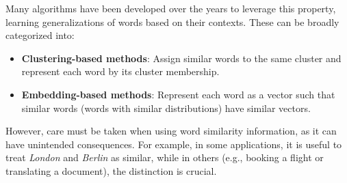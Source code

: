 Many algorithms have been developed over the years to leverage this property, learning generalizations of words based on their contexts. These can be broadly categorized into:
\begin{itemize}
    \item \textbf{Clustering-based methods}: Assign similar words to the same cluster and represent each word by its cluster membership.
    \item \textbf{Embedding-based methods}: Represent each word as a vector such that similar words (words with similar distributions) have similar vectors.
\end{itemize}

However, care must be taken when using word similarity information, as it can have unintended consequences. For example, in some applications, it is useful to treat \textit{London} and \textit{Berlin} as similar, while in others (e.g., booking a flight or translating a document), the distinction is crucial.